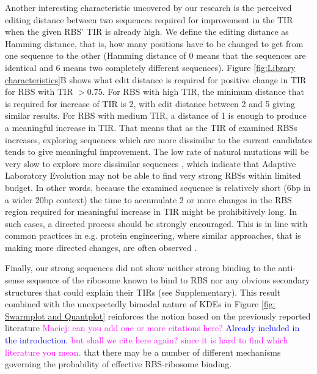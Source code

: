 \documentclass{article}
\newcommand{\mengyan}[1]{\textcolor{magenta}{#1}}
\newcommand{\maciej}[1]{\textcolor{blue}{#1}}
\begin{document}
Another interesting characteristic uncovered by our research is the perceived editing distance between two sequences required for  improvement in the TIR when the given RBS' TIR is already high. 
We define the editing distance as Hamming distance, that is, how many positions have to be changed to get from one sequence to the other (Hamming distance of 0 means that the sequences are identical and 6 means two completely different sequences).
Figure \ref{fig:Library characteristics}B shows what edit distance is required for positive change in TIR for RBS with TIR $>0.75$.
For RBS with high TIR, the minimum distance that is required for increase of TIR is 2, with edit distance between 2 and 5 giving similar results.
For RBS with medium TIR, a distance of 1 is enough to produce a meaningful increase in TIR.
That means that as the TIR of examined RBSs increases, 
exploring sequences which are more dissimilar to the current candidates tends to give meaningful improvement. 
The low rate of natural mutations will be very slow to explore more dissimilar sequences \cite{Lee2012},
which indicate that Adaptive Laboratory Evolution may not be able to find very strong RBSs within limited budget.  
In other words, because the examined sequence is relatively short (6bp in a wider 20bp context) the time to accumulate 2 or more changes in the RBS region required for meaningful increase in TIR might be prohibitively long.
In such cases, a directed process should be strongly encouraged.
This is in line with common practices in e.g. protein engineering, where similar approaches, that is making more directed changes, are often observed \cite{Jackel2008}.

Finally, our strong sequences did not show neither strong binding to the anti-sense sequence of the ribosome known to bind to RBS nor any obvious secondary structures that could explain their TIRs (see Supplementary).
This result combined with the unexpectedly bimodal nature of KDEs in Figure \ref{fig: Swarmplot and Quantplot} reinforces the notion based on the previously reported literature \mengyan{Maciej: can you add one or more citations here?} \maciej{Already included in the introduction.} \mengyan{but shall we cite here again? since it is hard to find which literature you mean.} that there may be a number of different mechanisms governing the probability of effective RBS-ribosome binding.\\
\end{document}
